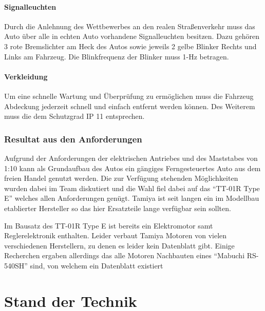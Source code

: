 \documentclass[11pt,twoside,a4paper]{mpreport}
\begin{document}
\subsubsection{Signalleuchten}
Durch die Anlehnung des Wettbewerbes an den realen Straßenverkehr muss das Auto über alle in echten Auto vorhandene Signalleuchten besitzen. 
Dazu gehören 3 rote Bremslichter am Heck des Autos sowie jeweils 2 gelbe Blinker Rechts und Links am Fahrzeug.  Die Blinkfrequenz der Blinker muss
1-Hz betragen.

\subsubsection{Verkleidung}
Um eine schnelle Wartung und Überprüfung zu ermöglichen muss die Fahrzeug Abdeckung jederzeit schnell und einfach entfernt werden können. Des Weiterem muss die dem 
Schutzgrad IP 11 entsprechen.


\subsection{Resultat aus den Anforderungen}
Aufgrund der Anforderungen der elektrischen Antriebes und des Maststabes von 1:10 kann als Grundaufbau des Autos ein gängiges Ferngesteuertes Auto aus dem
freien Handel genutzt werden. Die zur Verfügung stehenden Möglichkeiten wurden dabei im Team diskutiert und die Wahl fiel dabei auf das ``TT-01R Type E'' welches
allen Anforderungen genügt. Tamiya ist seit langen ein im Modellbau etablierter Hersteller so das hier Ersatzteile lange verfügbar sein sollten.

Im Bausatz des TT-01R Type E ist bereits ein Elektromotor samt Reglerelektronik enthalten. Leider verbaut Tamiya Motoren von vielen verschiedenen Herstellern,
zu denen es leider kein Datenblatt gibt. Einige Recherchen ergaben allerdings das alle Motoren Nachbauten eines ``Mabuchi RS-540SH'' sind, von welchem ein Datenblatt
existiert \cite{Mabuchi}








\chapter{Stand der Technik}












\listoffigures

{}

\end{document}

